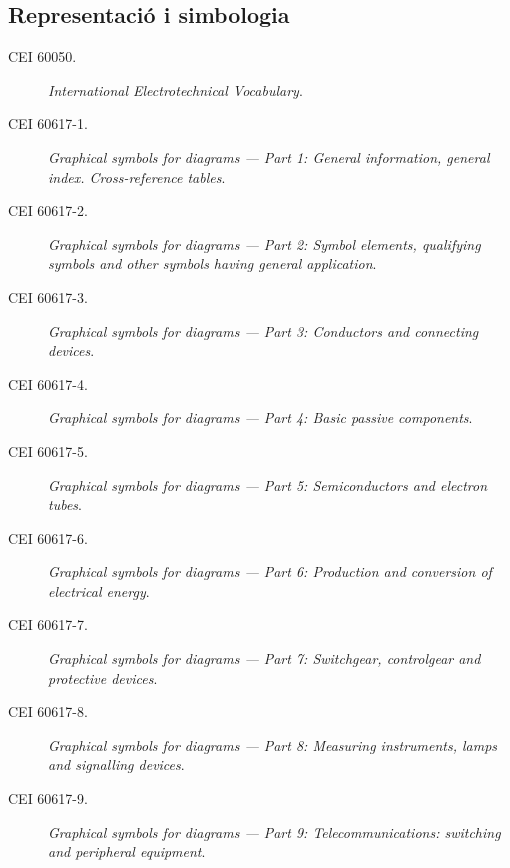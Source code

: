 \subsection*{Representació i simbologia}
\begin{description}
	\item [\hspace{5mm}CEI 60050.] \textit{International Electrotechnical Vocabulary}. 
	\item [\hspace{5mm}CEI 60617-1.] \textit{Graphical symbols for diagrams --- Part 1: General information, general index. Cross-reference tables}.
	\item [\hspace{5mm}CEI 60617-2.] \textit{Graphical symbols for diagrams --- Part 2: Symbol elements, qualifying symbols and other symbols having general application}.
	\item [\hspace{5mm}CEI 60617-3.] \textit{Graphical symbols for diagrams --- Part 3: Conductors and connecting devices}.
	\item [\hspace{5mm}CEI 60617-4.] \textit{Graphical symbols for diagrams --- Part 4: Basic passive components}.
	\item [\hspace{5mm}CEI 60617-5.] \textit{Graphical symbols for diagrams --- Part 5: Semiconductors and electron tubes}.
	\item [\hspace{5mm}CEI 60617-6.] \textit{Graphical symbols for diagrams --- Part 6: Production and conversion of electrical energy}.
	\item [\hspace{5mm}CEI 60617-7.] \textit{Graphical symbols for diagrams --- Part 7: Switchgear, controlgear and protective devices}.
	\item [\hspace{5mm}CEI 60617-8.] \textit{Graphical symbols for diagrams --- Part 8: Measuring instruments, lamps and signalling devices}.
	\item [\hspace{5mm}CEI 60617-9.] \textit{Graphical symbols for diagrams --- Part 9: Telecommunications: switching and peripheral equipment}.

\end{description}
